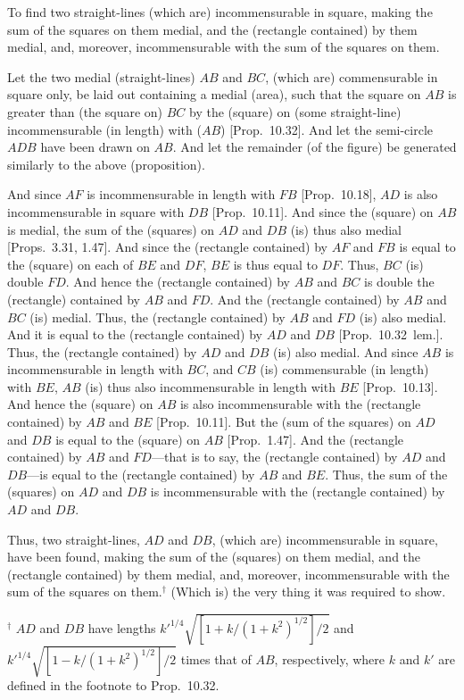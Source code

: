 \begin{Parallel}{}{}
{To find two straight-lines (which are) incommensurable in square, making the sum of the squares on them medial,
and the (rectangle contained) by them medial, and, moreover,
incommensurable  with the sum of the squares on them.

\centerline{}

Let the two medial (straight-lines) $AB$ and $BC$, (which are) commensurable in square only, be laid out containing a medial (area), such
that the square on $AB$ is greater than (the square on) $BC$ by the
(square) on (some straight-line) incommensurable (in length) with ($AB$) [Prop.~10.32].  And let the semi-circle
$ADB$ have been drawn on $AB$. And let the remainder (of the figure)
be generated similarly to the above (proposition).

And since $AF$ is incommensurable in length with $FB$ [Prop.~10.18], $AD$
is also incommensurable in square with $DB$ [Prop.~10.11]. And since the (square) on $AB$ is
medial, the sum of the (squares) on $AD$ and $DB$ (is) thus also
medial [Props.~3.31, 1.47]. And since the (rectangle
contained) by $AF$ and $FB$ is equal to the (square) on each of $BE$ and
$DF$, $BE$ is thus equal to $DF$. Thus, $BC$ (is) double $FD$. And
hence the (rectangle contained) by $AB$ and $BC$ is double the
(rectangle) contained by $AB$ and $FD$. And the (rectangle contained)
by $AB$ and $BC$ (is) medial. Thus, the (rectangle contained) by $AB$
and $FD$ (is) also medial. And it is equal to the (rectangle contained) 
by $AD$ and $DB$ [Prop.~10.32~lem.]. Thus, the
(rectangle contained) by $AD$ and $DB$ (is) also medial.
And since $AB$ is incommensurable in length with $BC$, and $CB$
(is) commensurable (in length) with $BE$, $AB$ (is) thus also incommensurable
in length with $BE$ [Prop.~10.13]. And hence the (square) on $AB$ is also incommensurable with the (rectangle contained) by $AB$ and $BE$ [Prop.~10.11]. But the (sum of the squares) on $AD$ and
$DB$ is equal to the (square) on $AB$ [Prop.~1.47].
And the (rectangle contained) by $AB$ and $FD$---that is to say, the (rectangle contained) by $AD$ and $DB$---is equal to the
(rectangle contained) by $AB$ and $BE$. Thus, the sum of the (squares) on
$AD$ and $DB$ is incommensurable with the (rectangle contained) by
$AD$ and $DB$.

Thus, two straight-lines, $AD$ and $DB$, (which are) incommensurable
in square, have been found, making the sum of the (squares) on them
medial, and the (rectangle contained) by them medial, and, moreover, 
incommensurable  with the sum of the squares on them.$^\dag$
 (Which is) the
very thing it was required to show.}
\end{Parallel}
{\footnotesize\noindent$^\dag$ $AD$ and $DB$ have lengths
${k'}^{1/4}\sqrt{[1+k/(1+k^2)^{1/2}]/2}$ and  ${k'}^{1/4}\sqrt{[1-k/(1+k^2)^{1/2}]/2}$ times that of $AB$, respectively, where $k$ and $k'$
are defined in the footnote to Prop.~10.32.}


